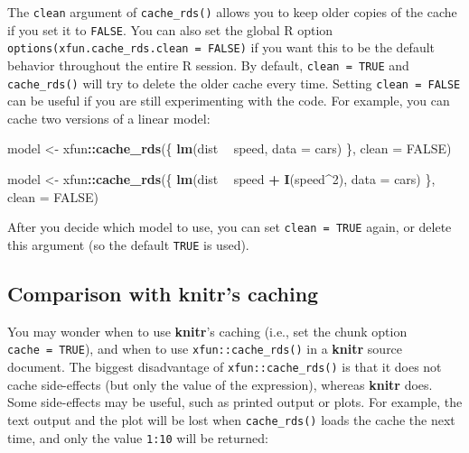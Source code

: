 \documentclass[
  11pt,
]{krantz}
\newenvironment{Shaded}{\begin{snugshade}}{\end{snugshade}}
\newcommand{\DataTypeTok}[1]{\textcolor[rgb]{0.27,0.27,0.27}{#1}}
\newcommand{\DecValTok}[1]{\textcolor[rgb]{0.06,0.06,0.06}{#1}}
\newcommand{\KeywordTok}[1]{\textcolor[rgb]{0.27,0.27,0.27}{\textbf{#1}}}
\newcommand{\NormalTok}[1]{#1}
\newcommand{\OperatorTok}[1]{\textcolor[rgb]{0.43,0.43,0.43}{\textbf{#1}}}
\newcommand{\OtherTok}[1]{\textcolor[rgb]{0.37,0.37,0.37}{#1}}
\newcommand{\StringTok}[1]{\textcolor[rgb]{0.5,0.5,0.5}{#1}}
\begin{document}
The \texttt{clean} argument of \texttt{cache\_rds()} allows you to keep older copies of the cache if you set it to \texttt{FALSE}. You can also set the global R option \texttt{options(xfun.cache\_rds.clean\ =\ FALSE)} if you want this to be the default behavior throughout the entire R session. By default, \texttt{clean\ =\ TRUE} and \texttt{cache\_rds()} will try to delete the older cache every time. Setting \texttt{clean\ =\ FALSE} can be useful if you are still experimenting with the code. For example, you can cache two versions of a linear model:

\begin{Shaded}
\begin{Highlighting}[]
\NormalTok{model <-}\StringTok{ }\NormalTok{xfun}\OperatorTok{::}\KeywordTok{cache_rds}\NormalTok{(\{}
  \KeywordTok{lm}\NormalTok{(dist }\OperatorTok{~}\StringTok{ }\NormalTok{speed, }\DataTypeTok{data =}\NormalTok{ cars)}
\NormalTok{\}, }\DataTypeTok{clean =} \OtherTok{FALSE}\NormalTok{)}

\NormalTok{model <-}\StringTok{ }\NormalTok{xfun}\OperatorTok{::}\KeywordTok{cache_rds}\NormalTok{(\{}
  \KeywordTok{lm}\NormalTok{(dist }\OperatorTok{~}\StringTok{ }\NormalTok{speed }\OperatorTok{+}\StringTok{ }\KeywordTok{I}\NormalTok{(speed}\OperatorTok{^}\DecValTok{2}\NormalTok{), }\DataTypeTok{data =}\NormalTok{ cars)}
\NormalTok{\}, }\DataTypeTok{clean =} \OtherTok{FALSE}\NormalTok{)}
\end{Highlighting}
\end{Shaded}

After you decide which model to use, you can set \texttt{clean\ =\ TRUE} again, or delete this argument (so the default \texttt{TRUE} is used).

\hypertarget{comparison-with-knitrs-caching}{%
\subsection{\texorpdfstring{Comparison with \textbf{knitr}'s caching}{Comparison with knitr's caching}}\label{comparison-with-knitrs-caching}}

You may wonder when to use \textbf{knitr}'s caching (i.e., set the chunk option \texttt{cache\ =\ TRUE}), and when to use \texttt{xfun::cache\_rds()} in a \textbf{knitr} source document. The biggest disadvantage of \texttt{xfun::cache\_rds()} is that it does not cache side-effects (but only the value of the expression), whereas \textbf{knitr} does. Some side-effects may be useful, such as printed output or plots. For example, the text output and the plot will be lost when \texttt{cache\_rds()} loads the cache the next time, and only the value \texttt{1:10} will be returned:
\end{document}
